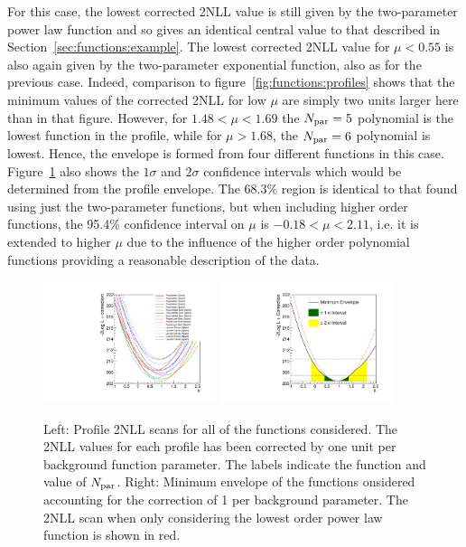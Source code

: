 For this case, the lowest corrected 2NLL value is still given by the
two-parameter power law function and so gives an identical central value
to that described in Section~\ref{sec:functions:example}. The lowest corrected
2NLL value for $\mu < 0.55$ is also again given by the two-parameter exponential
function, also as for the previous case. 
Indeed, comparison to figure~\ref{fig:functions:profiles} shows that the
minimum values of the corrected 2NLL for low $\mu$
are simply two units larger here than in that figure.
However, for $1.48 < \mu < 1.69$ 
the $N_{\rm par}=5$ polynomial is the lowest function in the profile,
while for $\mu > 1.68$,
the $N_{\rm par}=6$ polynomial is lowest.
Hence, the envelope is formed from four different functions in this
case. Figure~\ref{fig:correction:profiles} also shows the $1\sigma$ and 
$2\sigma$ confidence intervals which would be determined from the 
profile envelope. The 68.3\% region is identical to that found using
just the two-parameter functions, but
when including higher order functions, the 95.4\% confidence interval 
on $\mu$ is $-0.18 < \mu < 2.11$,
i.e. it is extended to higher $\mu$
due to the influence of the higher order polynomial functions providing a 
reasonable description of the data.

\begin{figure}[tbp]
\centering
\includegraphics[width=0.45\textwidth]{correction/ProfilesAllOrders.pdf}
\includegraphics[width=0.45\textwidth]{correction/EnvelopeAllOrders.pdf}
\caption{Left: Profile 2NLL scans for all of the functions considered. The 2NLL values for
each profile has been corrected by one unit per background function parameter.
The labels indicate the function and value of $N_{\rm par}$.
Right: Minimum envelope of the functions onsidered accounting for the correction of 1 per 
background parameter. The 2NLL scan when only considering the lowest order power law function 
is shown in red.}
\label{fig:correction:profiles}
\end{figure}


